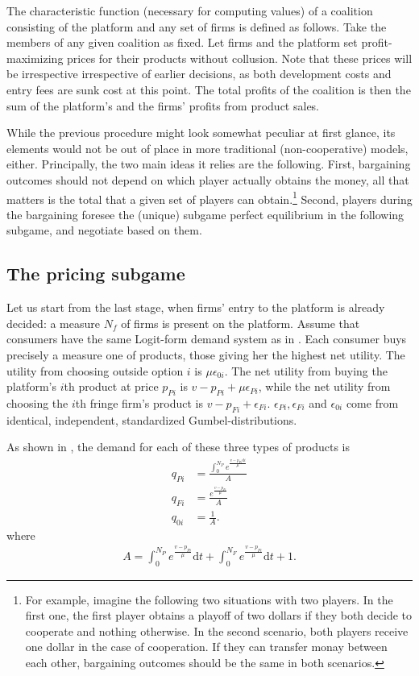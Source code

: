 \documentclass[a4paper]{article}
\newcommand{\dt}{\mathrm{d}t}
\newcommand{\di}{\mathrm{d}i}
\begin{document}
The characteristic function (necessary for computing values) of a coalition consisting of the platform and any set of firms is defined as follows. Take the members of any given coalition as fixed. Let firms and the platform set profit-maximizing prices for their products without collusion. Note that these prices will be irrespective irrespective of earlier decisions, as both development costs and entry fees are sunk cost at this point. The total profits of the coalition is then the sum of the platform's and the firms' profits from product sales.

While the previous procedure might look somewhat peculiar at first glance, its elements would not be out of place in more traditional (non-cooperative) models, either. Principally, the two main ideas it relies are the following. First, bargaining outcomes should not depend on which player actually obtains the money, all that matters is the total that a given set of players can obtain.\footnote{For example, imagine the following two situations with two players. In the first one, the first player obtains a playoff of two dollars if they both decide to cooperate and nothing otherwise. In the second scenario, both players receive one dollar in the case of cooperation. If they can transfer monay between each other, bargaining outcomes should be the same in both scenarios.} Second, players during the bargaining foresee the (unique) subgame perfect equilibrium in the following subgame, and negotiate based on them.

\subsection{The pricing subgame}

Let us start from the last stage, when firms' entry to the platform is already decided: a measure $N_f$ of firms is present on the platform. Assume that consumers have the same Logit-form demand system as in \textcite{anderson2021hybrid}. Each consumer buys precisely a measure one of products, those giving her the highest net utility. The utility from choosing outside option $i$ is $\mu \epsilon_{0i}$. The net utility from buying the platform's $i$th product at price $p_{Pi}$ is $v - p_{Pi} + \mu \epsilon_{Pi}$, while the net utility from choosing the $i$th fringe firm's product is $v - p_{Fi} + \epsilon_{Fi}$. $\epsilon_{Pi}, \epsilon_{Fi}$ and $\epsilon_{0i}$ come from identical, independent, standardized Gumbel-distributions.

As shown in \textcite{anderson2021hybrid}, the demand for each of these three types of products is
\begin{align*}
    q_{Pi} &= \frac{\int_0^{N_P}  e^\frac{v - p_{Pi} \di}{\mu}}{A} \\
    q_{Fi} &= \frac{e^\frac{v - p_{Fi}}{\mu}}{A} \\
    q_{0i} &= \frac{1}{A} .
\end{align*}
where
\begin{align*}
    A = \int_0^{N_P} e^\frac{v - p_{Pi}}{\mu} \dt + \int_0^{N_F} e^\frac{v - p_{Fi}}{\mu} \dt + 1.
\end{align*}
\end{document}
